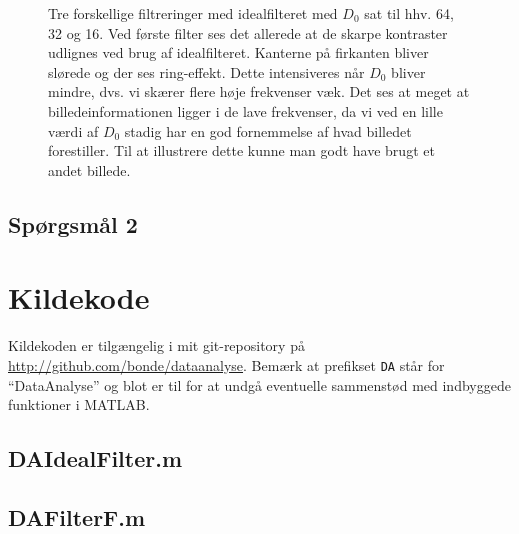 \documentclass[a4paper, 10pt, danish, final]{article}
\def\repository{\url{http://github.com/bonde/dataanalyse}}
\begin{document}
\begin{figure}[!h]
    \caption[]{Tre forskellige filtreringer med idealfilteret med
    $D_0$ sat til hhv. 64, 32 og 16. Ved første filter ses det allerede
    at de skarpe kontraster udlignes ved brug af idealfilteret. Kanterne
    på firkanten bliver slørede og der ses ring-effekt. Dette
    intensiveres når $D_0$ bliver mindre, dvs. vi skærer flere høje
    frekvenser væk. Det ses at meget at billedeinformationen ligger i de
    lave frekvenser, da vi ved en lille værdi af $D_0$ stadig har en god
    fornemmelse af hvad billedet forestiller. Til at illustrere dette
    kunne man godt have brugt et andet billede.}
    \label{ideal_filter}
\end{figure}
\clearpage

\subsection*{Spørgsmål 2}



%
%

\appendix
\lstset{language=Matlab, basicstyle=\scriptsize,
    showstringspaces=false, numbers=left, stepnumber=1,
    numberstyle=\tiny, frame=none}
\section{Kildekode}
Kildekoden er tilgængelig i mit git-repository på \repository{}. Bemærk
at prefikset \texttt{DA} står for ``DataAnalyse'' og blot er til for at
undgå eventuelle sammenstød med indbyggede funktioner i MATLAB.

\subsection{DAIdealFilter.m}


\subsection{DAFilterF.m}

\end{document}
